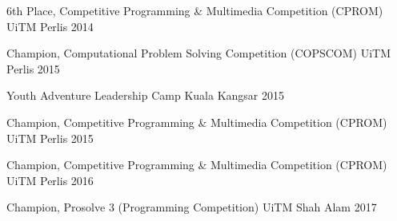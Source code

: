\begin{cvhonors}

  \cvhonor
    {6th Place,}
    {Competitive Programming \& Multimedia Competition (CPROM)}
    {UiTM Perlis}
    {2014}

  \cvhonor
    {Champion,}
    {Computational Problem Solving Competition (COPSCOM)}
    {UiTM Perlis}
    {2015}

  \cvhonor
    {}
    {Youth Adventure Leadership Camp}
    {Kuala Kangsar}
    {2015}

  \cvhonor
    {Champion,}
    {Competitive Programming \& Multimedia Competition (CPROM)}
    {UiTM Perlis}
    {2015}
        
  \cvhonor
    {Champion,}
    {Competitive Programming \& Multimedia Competition (CPROM)}
    {UiTM Perlis}
    {2016}

  \cvhonor
    {Champion,}
    {Prosolve 3 (Programming Competition)}
    {UiTM Shah Alam}
    {2017}

\end{cvhonors}
\pagebreak